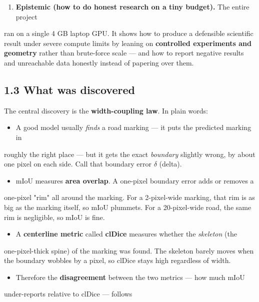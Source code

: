 \documentclass[11pt]{article}
\begin{document}
\begin{enumerate}\setlength{\itemsep}{1pt}
\item \textbf{Epistemic (how to do honest research on a tiny budget).} The entire project
\end{enumerate}
   ran on a single 4 GB laptop GPU. It shows how to produce a defensible scientific    result under severe compute limits by leaning on \textbf{controlled experiments and    geometry} rather than brute-force scale --- and how to report negative results and    unreachable data honestly instead of papering over them.

\subsection*{1.3 What was discovered}

The central discovery is the \textbf{width-coupling law}. In plain words:

\begin{itemize}\setlength{\itemsep}{1pt}
\item A good model usually \textit{finds} a road marking --- it puts the predicted marking in
\end{itemize}
  roughly the right place --- but it gets the exact \textit{boundary} slightly wrong, by   about one pixel on each side. Call that boundary error \texttt{$\delta$} (delta).
\begin{itemize}\setlength{\itemsep}{1pt}
\item mIoU measures \textbf{area overlap}. A one-pixel boundary error adds or removes a
\end{itemize}
  one-pixel "rim" all around the marking. For a 2-pixel-wide marking, that rim is as   big as the marking itself, so mIoU plummets. For a 20-pixel-wide road, the same   rim is negligible, so mIoU is fine.
\begin{itemize}\setlength{\itemsep}{1pt}
\item A \textbf{centerline metric} called \textbf{clDice} measures whether the \textit{skeleton} (the
\end{itemize}
  one-pixel-thick spine) of the marking was found. The skeleton barely moves when   the boundary wobbles by a pixel, so clDice stays high regardless of width.
\begin{itemize}\setlength{\itemsep}{1pt}
\item Therefore the \textbf{disagreement} between the two metrics --- how much mIoU
\end{itemize}
  under-reports relative to clDice --- follows
\end{document}
